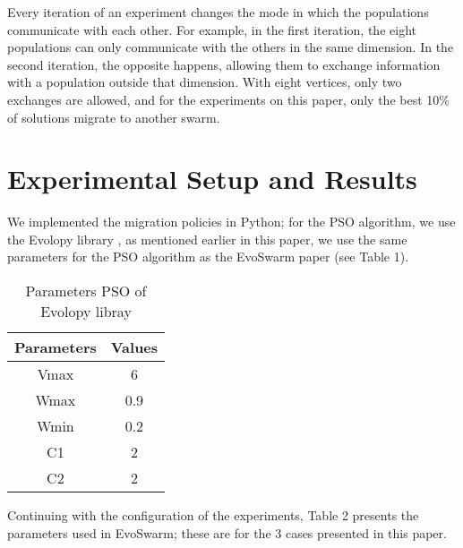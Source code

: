 \documentclass[runningheads]{llncs}
\begin{document}
Every iteration of an experiment changes the mode in which the populations
communicate with each other. For example, in the first iteration, the eight
populations can only communicate with the others in the same dimension. In the
second iteration, the opposite happens, allowing them to exchange information
with a population outside that dimension. With eight vertices, only two
exchanges are allowed, and for the experiments on this paper, only the best 10\%
of solutions migrate to another swarm.


\section{Experimental Setup and Results}

We implemented the migration policies in Python; for the PSO algorithm, we use
the Evolopy library \cite{b19}, as mentioned earlier in this paper, we use the
same parameters for the PSO algorithm as the EvoSwarm paper (see Table 1).



\begin{table}[h!]
\centering
\caption{Parameters PSO of Evolopy libray}
\begin{tabular}{|c c|} 
 \hline
 Parameters & Values  \\ [0.5ex] 
 \hline\hline
 Vmax & 6 \\ 
 Wmax & 0.9 \\
 Wmin & 0.2 \\
C1 & 2 \\
C2 & 2 \\[0.5ex]
 \hline
\end{tabular}
\label{table:1}
\end{table}

Continuing with the configuration of the experiments, Table 2 presents the
parameters used in EvoSwarm; these are for the 3 cases presented in this paper.

\begin{table}[h]
\centering
\caption{Parameters for EvoSwarm}
\label{table:1}
\end{table}
\end{document}
